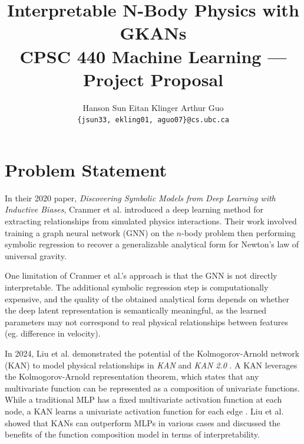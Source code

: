 \documentclass[11pt]{article}
\title{%
  \textbf{Interpretable N-Body Physics with GKANs}\\[0.4em]
  \large CPSC 440 Machine Learning --- Project Proposal
}
\author{
  Hanson Sun \quad Eitan Klinger \quad Arthur Guo\\
  \small\texttt{\{jsun33, ekling01, aguo07\}@cs.ubc.ca}
}
\begin{document}
\maketitle
\thispagestyle{empty}

\section{Problem Statement}



In their 2020 paper, \textit{Discovering Symbolic Models from Deep Learning with Inductive Biases},
Cranmer et al.\cite{cranmer2020discoveringsymbolicmodelsdeep} introduced a deep learning method for extracting relationships from simulated physics
interactions. Their work involved training a graph neural network (GNN) on the $n$-body problem then
performing symbolic regression to recover a generalizable analytical form for Newton's law of universal gravity.

One limitation of Cranmer et al.'s\cite{cranmer2020discoveringsymbolicmodelsdeep} approach is that the GNN is not directly interpretable. The additional symbolic regression step is computationally expensive, and the quality of the obtained analytical form
depends on whether the deep latent representation is semantically meaningful, as the learned parameters
may not correspond to real physical relationships between features (eg. difference in velocity).

In 2024, Liu et al. demonstrated the potential of the Kolmogorov-Arnold network (KAN) to model physical
relationships in \textit{KAN} \cite{liu2024kankolmogorovarnoldnetworks} and \textit{KAN 2.0} \cite{liu2024kan20kolmogorovarnoldnetworks}. A KAN leverages the Kolmogorov-Arnold
representation theorem, which states that any multivariate function can be represented as a composition of univariate functions. While a traditional MLP has a fixed multivariate activation function at each node,
a KAN learns a univariate activation function for each edge \cite{liu2024kankolmogorovarnoldnetworks}. Liu et al.\cite{liu2024kankolmogorovarnoldnetworks}\cite{liu2024kan20kolmogorovarnoldnetworks} showed that KANs can outperform
MLPs in various cases and discussed the benefits of the function composition model in terms of interpretability.
\end{document}

